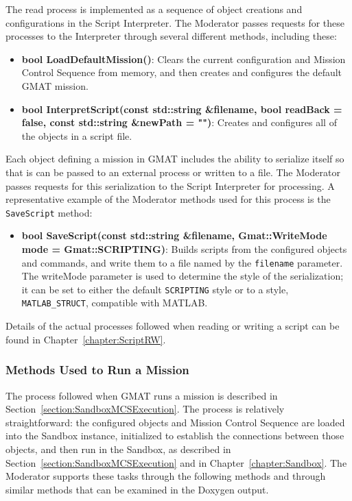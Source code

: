The read process is implemented as a sequence of object creations and configurations in the
Script Interpreter.  The Moderator passes requests for these processes to the Interpreter through
several different methods, including these:

\begin{itemize}
\item \textbf{bool LoadDefaultMission()}:  Clears the current configuration and Mission Control
Sequence from memory, and then creates and configures the default GMAT mission.
\item \textbf{bool InterpretScript(const std::string \&filename, bool readBack = false, const
std::string \&newPath = "")}:  Creates and configures all of the objects in a script file.
\end{itemize}

Each object defining a mission in GMAT includes the ability to serialize itself so that is can be
passed to an external process or written to a file.  The Moderator passes requests for this
serialization to the Script Interpreter for processing.  A representative example of the Moderator
methods used for this process is the \texttt{SaveScript} method:

\begin{itemize}
\item \textbf{bool SaveScript(const std::string \&filename, Gmat::WriteMode mode =
Gmat::SCRIPTING)}:  Builds scripts from the configured objects and commands, and write them to a
file named by the \texttt{filename} parameter.  The writeMode parameter is used to determine the
style of the serialization; it can be set to either the default \texttt{SCRIPTING} style or to a
style, \texttt{MATLAB\_STRUCT}, compatible with MATLAB.
\end{itemize}

\noindent Details of the actual processes followed when reading or writing a script can be found in
Chapter~\ref{chapter:ScriptRW}.

\subsubsection{Methods Used to Run a Mission}

The process followed when GMAT runs a mission is described in
Section~\ref{section:SandboxMCSExecution}.  The process is relatively straightforward: the
configured objects and Mission Control Sequence are loaded into the Sandbox instance, initialized
to establish the connections between those objects, and then run in the Sandbox, as described in
Section~\ref{section:SandboxMCSExecution} and in Chapter~\ref{chapter:Sandbox}.  The Moderator
supports these tasks through the following methods and through similar methods that can be examined
in the Doxygen output.

